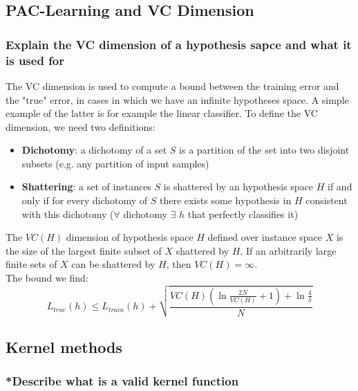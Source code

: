 \subsection{PAC-Learning and VC Dimension}
\subsubsection{Explain the VC dimension of a hypothesis sapce and what it is used for}
    The VC dimension is used to compute a bound between the training error and the "true" error, in cases in which we have an infinite hypotheses space. A simple example of the latter is for example the linear classifier.
    To define the VC dimension, we need two definitions:
    \begin{itemize}
        \item \textbf{Dichotomy}: a dichotomy of a set $S$ is a partition of the set into two disjoint subsets (e.g. any partition of input samples)
        \item \textbf{Shattering}: a set of instances $S$ is shattered by an hypothesis space $H$ if and only if for every dichotomy of $S$ there exists some hypothesis in $H$ consistent with this dichotomy ($\forall$ dichotomy $\exists$ $h$ that perfectly classifies it)
    \end{itemize}
    The $VC(H)$ dimension of hypothesis space $H$ defined over instance space $X$ is the size of the largest finite subset of $X$ shattered by $H$. If an arbitrarily large finite sets of $X$ can be shattered by $H$, then $VC(H)=\infty$.\\
    The bound we find:
    $$L_{true}(h) \leq L_{train} (h) + \sqrt{\frac{VC(H)\left(\ln\frac{2N}{VC(H)} +1\right)+ \ln\frac{4}{\delta}}{N}}$$

\subsection{Kernel methods}
\subsubsection{*Describe what is a valid kernel function}

